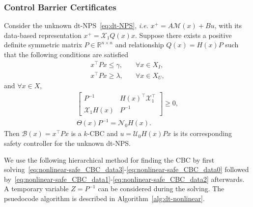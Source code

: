 \documentclass[sigconf]{acmart}
\newcommand{\BW}{\textcolor{red}}
\begin{document}
\subsubsection{Control Barrier Certificates}

\begin{theorem}
\label{thm:data-dtNPS-CBC}
Consider the unknown dt-NPS~\eqref{eq:dt-NPS}, \emph{i.e.} $x^+ = A\mathcal{M}(x)+Bu$, with its data-based representation $x^+=\mathcal{X}_{1}Q(x)x$.
Suppose there exists a positive definite symmetric matrix $P\in\mathbb{R}^{n\times n}$ and relationship $Q(x) = H(x)P$ such that the following conditions are satisfied
\begin{align}
\label{eq:nonlinear-safe_CBC_data1}
x^\top Px \leq \gamma, &\quad\forall x\in X_I, \\
\label{eq:nonlinear-safe_CBC_data2}
x^\top Px \geq \lambda, &\quad\forall x\in X_U,
\end{align}
and $\forall x\in X$,
\begin{align}
\label{eq:nonlinear-safe_CBC_data3}
\begin{bmatrix}
P^{-1}              & H(x)^\top \mathcal{X}_{1}^\top \\
\mathcal{X}_{1}H(x) & P^{-1}
\end{bmatrix} \geq 0,\\
\label{eq:nonlinear-safe_CBC_data0}
\Theta(x)P^{-1} = \mathcal{N}_{0}H(x).
\end{align}
Then $\mathcal{B}(x) = x^\top Px$ is a $k$-CBC and $u = \mathcal{U}_{0}H(x)Px$ is its corresponding safety controller for the unknown dt-NPS.
\end{theorem}

We use the following hierarchical method for finding the CBC by first solving~\eqref{eq:nonlinear-safe_CBC_data3}-\eqref{eq:nonlinear-safe_CBC_data0} followed by~\eqref{eq:nonlinear-safe_CBC_data1}-\eqref{eq:nonlinear-safe_CBC_data2} afterwards.
A temporary variable $Z=P^{-1}$ can be considered during the solving.
The psuedocode algorithm is described in Algorithm~\ref{alg:dt-nonlinear}.
\end{document}
